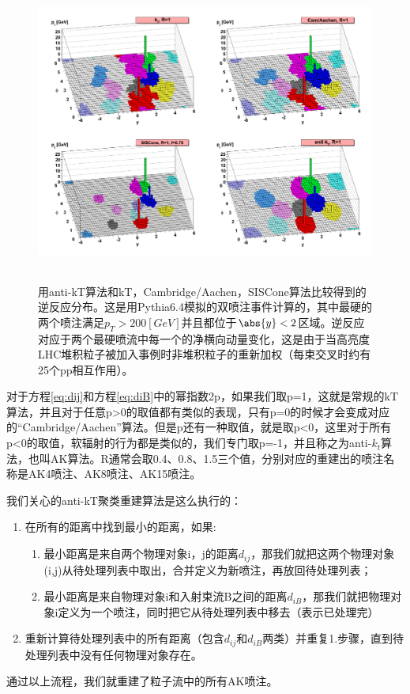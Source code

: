 \begin{figure}[H]
 \centering
 \includegraphics[height=10cm, width=13cm]{pictures/anti-kt-3D.png}
 \caption{用anti-kT算法和kT，Cambridge/Aachen，SISCone算法比较得到的逆反应分布。这是用Pythia6.4模拟的双喷注事件计算的，其中最硬的两个喷注满足$p_T>200[GeV]$并且都位于$\abs{y}<2$区域。逆反应对应于两个最硬喷流中每一个的净横向动量变化，这是由于当高亮度LHC堆积粒子被加入事例时非堆积粒子的重新加权（每束交叉时约有25个pp相互作用）。\cite{The_anti-kt_jet_clustering_algorithm}}
 \label{fig:3.5}
\end{figure}

对于方程\eqref{eq:dij}和方程\eqref{eq:diB}中的幂指数2p，如果我们取p=1，这就是常规的kT算法，并且对于任意p>0的取值都有类似的表现，只有p=0的时候才会变成对应的“Cambridge/Aachen”算法。但是p还有一种取值，就是取p<0，这里对于所有p<0的取值，软辐射的行为都是类似的，我们专门取p=-1，并且称之为anti-$k_t$算法，也叫AK算法。R通常会取0.4、0.8、1.5三个值，分别对应的重建出的喷注名称是AK4喷注、AK8喷注、AK15喷注。

我们关心的anti-kT聚类重建算法是这么执行的：
\begin{enumerate}
    \item 在所有的距离中找到最小的距离，如果:
    \begin{enumerate}[(1)]
        \item 最小距离是来自两个物理对象i，j的距离$d_{ij}$，那我们就把这两个物理对象(i,j)从待处理列表中取出，合并定义为新喷注，再放回待处理列表；
        \item 最小距离是来自物理对象i和入射束流B之间的距离$d_{iB}$，那我们就把物理对象i定义为一个喷注，同时把它从待处理列表中移去（表示已处理完）
    \end{enumerate}
    \item 重新计算待处理列表中的所有距离（包含$d_{ij}$和$d_{iB}$两类）并重复1.步骤，直到待处理列表中没有任何物理对象存在。
\end{enumerate}
通过以上流程，我们就重建了粒子流中的所有AK喷注。

